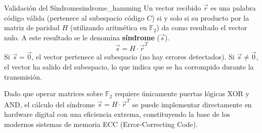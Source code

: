 \begin{teorema}{Validación del Síndrome}{sindrome_hamming}
Un vector recibido $\vec{r}$ es una palabra código válida (pertenece al subespacio código $C$) si y solo si su producto por la matriz de paridad $H$ (utilizando aritmética en $\mathbb{F}_2$) da como resultado el vector nulo. A este resultado se le denomina \textbf{síndrome} ($\vec{s}$).
\[ \vec{s} = H \cdot \vec{r}^T \]
Si $\vec{s} = \vec{0}$, el vector pertenece al subespacio (no hay errores detectados). Si $\vec{s} \ne \vec{0}$, el vector ha salido del subespacio, lo que indica que se ha corrompido durante la transmisión.
\end{teorema}

Dado que operar matrices sobre $\mathbb{F}_2$ requiere únicamente puertas lógicas XOR y AND, el cálculo del síndrome $\vec{s} = H \cdot \vec{r}^T$ se puede implementar directamente en hardware digital con una eficiencia extrema, constituyendo la base de los modernos sistemas de memoria ECC (Error-Correcting Code).
